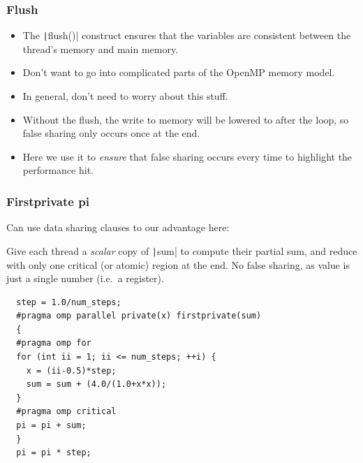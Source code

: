 \documentclass[aspectratio=169]{beamer}
\begin{document}
\begin{frame}
\frametitle{Flush}
\begin{itemize}
  \item The \texttt|flush()| construct ensures that the variables are consistent between the thread's memory and main memory.
  \item Don't want to go into complicated parts of the OpenMP memory model.
  \item In general, don't need to worry about this stuff.
  \item Without the flush, the write to memory will be lowered to after the loop, so false sharing only occurs once at the end.
  \item Here we use it to \emph{ensure} that false sharing occurs every time to highlight the performance hit.
\end{itemize}
\end{frame}

\begin{frame}[fragile]
\frametitle{Firstprivate pi}
Can use data sharing clauses to our advantage here:

Give each thread a \emph{scalar} copy of \texttt|sum| to compute their partial sum, and reduce with only one critical (or atomic) region at the end.
No false sharing, as value is just a single number (i.e.\ a register).
\begin{verbatim}
  step = 1.0/num_steps;
  #pragma omp parallel private(x) firstprivate(sum)
  {
  #pragma omp for
  for (int ii = 1; ii <= num_steps; ++i) {
    x = (ii-0.5)*step;
    sum = sum + (4.0/(1.0+x*x));
  }
  #pragma omp critical
  pi = pi + sum;
  }
  pi = pi * step;
\end{verbatim}
\end{frame}
\end{document}

